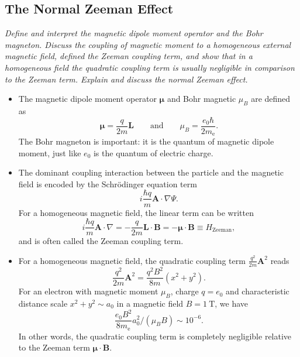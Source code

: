 \documentclass[11pt, a4paper]{article}
\renewcommand{\grad}{\nabla}
\newcommand{\eqtext}[1]{\qquad \text{#1} \qquad}
\newcommand{\Schro}{Schr\"{o}dinger\xspace}
\renewcommand{\vec}[1]{\bm{#1}}  %
\renewcommand{\L}{\vec{L}}  %
\newcommand{\A}{\vec{A}}  %
\newcommand{\B}{\vec{B}}  %
\newcommand{\m}{\vec{\mu}}  %
\renewcommand{\P}{\Psi}  %
\begin{document}
\subsection{The Normal Zeeman Effect} \label{ss:zeeman}
\textit{Define and interpret the magnetic dipole moment operator and the Bohr magneton. Discuss the coupling of magnetic moment to a homogeneous external magnetic field, defined the Zeeman coupling term, and show that in a homogeneous field the quadratic coupling term is usually negligible in comparison to the Zeeman term. Explain and discuss the normal Zeeman effect.}

\begin{itemize}

	\item The magnetic dipole moment operator $ \m $ and Bohr magnetic $ \mu_{B} $ are defined as
	\begin{equation*}
		\m = \frac{q}{2m}\L \eqtext{and} \mu_{B} = \frac{e_{0}\hbar}{2m_{\text{e}}}.
	\end{equation*}
	The Bohr magneton is important: it is the quantum of magnetic dipole moment, just like $ e_{0} $ is the quantum of electric charge.


    \item The dominant coupling interaction between the particle and the magnetic field is encoded by the \Schro equation term
    \begin{equation*}
        i \frac{\hbar q}{m} \A \cdot \grad \P.
    \end{equation*}
    For a homogeneous magnetic field, the linear term can be written
    \begin{equation*}
        i \frac{\hbar q}{m} \A \cdot \grad = - \frac{q}{2m}\L \cdot \B = - \m \cdot \B \equiv H_{\text{Zeeman}},
    \end{equation*}
    and is often called the Zeeman coupling term.
    
	\item For a homogeneous magnetic field, the quadratic coupling term $ \frac{q^{2}}{2m}\A^{2} $ reads
    \begin{equation*}
        \frac{q^{2}}{2m}\A^{2} = \frac{q^{2}B^{2}}{8 m}(x^{2} + y^{2}).
    \end{equation*}
	For an electron with magnetic moment $ \mu_{B}$, charge $ q = e_{0} $ and characteristic distance scale $ x^{2} + y^{2} \sim a_{0} $ in a magnetic field $ B = \SI{1}{\tesla} $, we have
	\begin{equation*}
		\frac{e_{0}B^{2}}{8m_{\text{e}}}a_{0}^{2} \Big / (\mu_{B}B) \sim 10^{-6}.
	\end{equation*}
	In other words, the quadratic coupling term is completely negligible relative to the Zeeman term $ \m \cdot \B $. 


\end{itemize}
\end{document}
